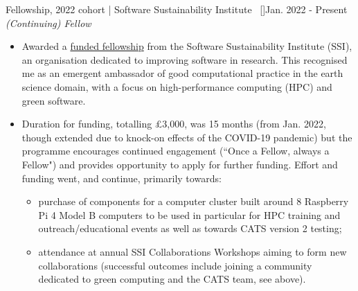 \begin{talks}
\projecta
	{Fellowship, 2022 cohort | Software Sustainability Institute {\normalfont ~[\href{https://www.software.ac.uk/news/announcing-2022-software-sustainability-institute-fellows}{\small{\websiteSymbol}}]}}{Jan. 2022 - Present}
	{
	    \textit{(Continuing) Fellow}
	}
	{
    \begin{itemize}
     \item Awarded a \href{https://www.software.ac.uk/programmes/fellowship-programme}{funded fellowship} from the Software Sustainability Institute (SSI), an organisation dedicated to improving software in research. This recognised me as an emergent ambassador of good computational practice in the earth science domain, with a focus on high-performance computing (HPC) and green software.
     \item Duration for funding, totalling £3,000, was 15 months (from Jan. 2022, though extended due to knock-on effects of the COVID-19 pandemic) but the programme encourages continued engagement (``Once a Fellow, always a Fellow") and provides opportunity to apply for further funding. Effort and funding went, and continue, primarily towards:
     \begin{itemize}
     \item purchase of components for a computer cluster built around 8 Raspberry Pi 4 Model B computers to be used in particular for HPC training and outreach/educational events as well as towards CATS version 2 testing;
     \item attendance at annual SSI Collaborations Workshops aiming to form new collaborations (successful outcomes include joining a community dedicated to green computing and the CATS team, see above).
     \end{itemize}
     
     \end{itemize}
     }


\end{talks}    
\vspace{-3mm}

